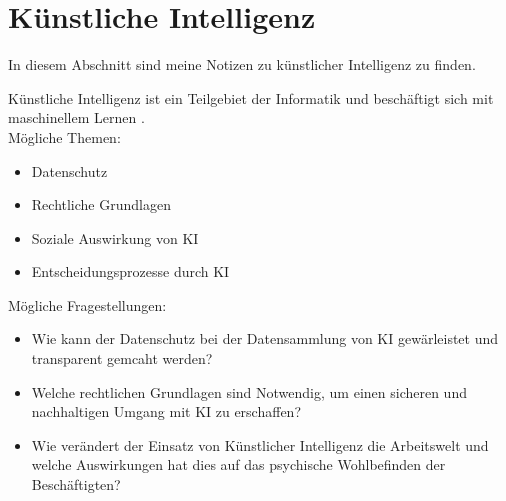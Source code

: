 \section{Künstliche Intelligenz}
\label{sec:ai}

In diesem Abschnitt sind meine Notizen zu künstlicher Intelligenz zu finden.

Künstliche Intelligenz ist ein Teilgebiet der Informatik und beschäftigt sich mit maschinellem Lernen \citep{ai-wikipedia}.
\\

\setlength{\parindent}{0pt}
Mögliche Themen:
    \begin{itemize}
    \item Datenschutz
    \item Rechtliche Grundlagen
    \item Soziale Auswirkung von KI 
    \item Entscheidungsprozesse durch KI 
    \end{itemize}
Mögliche Fragestellungen:
    \begin{itemize}
    \item Wie kann der Datenschutz bei der Datensammlung von KI gewärleistet und transparent gemcaht werden?
    \item Welche rechtlichen Grundlagen sind Notwendig, um einen sicheren und nachhaltigen Umgang mit KI zu erschaffen?
    \item Wie verändert der Einsatz von Künstlicher Intelligenz die Arbeitswelt und welche Auswirkungen hat dies auf das psychische Wohlbefinden der Beschäftigten?
    \end{itemize}
